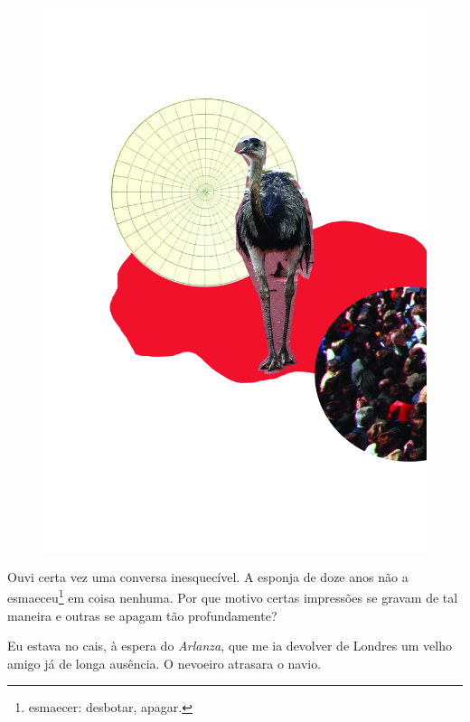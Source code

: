 \pagebreak
\thispagestyle{empty}
\begin{figure}
\includegraphics[width=\textwidth]{./ilustracoes/08_PEQUENINOS.jpg}
\end{figure}
\pagebreak


\noindent{}Ouvi certa vez uma conversa inesquecível. A esponja de doze anos não a
esmaeceu\footnote{esmaecer: desbotar, apagar.} em coisa nenhuma. Por que
motivo certas impressões se gravam de tal maneira e outras se apagam tão
profundamente?

Eu estava no cais, à espera do \emph{Arlanza}, que me ia devolver de
Londres um velho amigo já de longa ausência. O nevoeiro atrasara o
navio.

